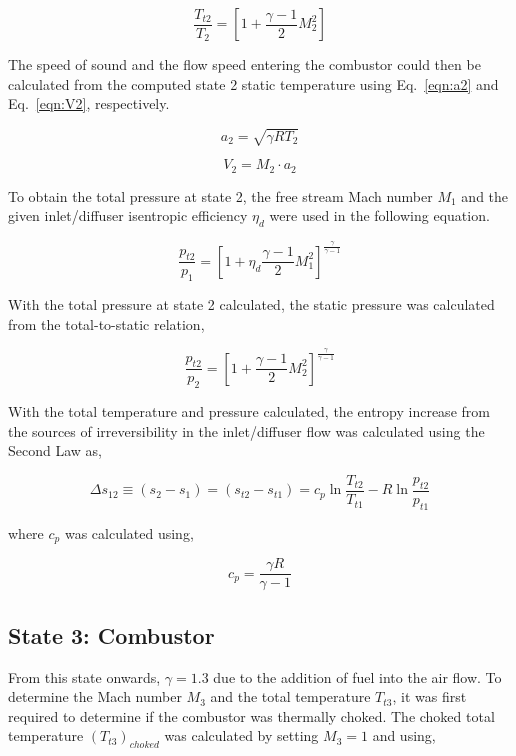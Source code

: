 \documentclass[conf]{new-aiaa} %
\begin{document}
\begin{equation}
    \label{eqn:T2}
    \frac{T_{t2}}{T_2}=\left[1+\frac{\gamma-1}{2}M_2^2\right]
\end{equation}

The speed of sound and the flow speed entering the combustor could then be calculated from the computed state 2 static temperature using Eq.~\eqref{eqn:a2} and Eq.~\eqref{eqn:V2}, respectively.

\begin{equation}
    \label{eqn:a2}
    a_2=\sqrt{\gamma R T_2}
\end{equation}

\begin{equation}
    \label{eqn:V2}
    V_2=M_2\cdot a_2
\end{equation}

To obtain the total pressure at state 2, the free stream Mach number $M_1$ and the given inlet/diffuser isentropic efficiency $\eta_d$ were used in the following equation.

\begin{equation}
    \label{eqn:pt2}
    \frac{p_{t2}}{p_1}=\left[1+\eta_d\frac{\gamma-1}{2}M_1^2\right]^{\frac{\gamma}{\gamma-1}}
\end{equation}

With the total pressure at state 2 calculated, the static pressure was calculated from the total-to-static relation,

\begin{equation}
    \label{eqn:p2}
    \frac{p_{t2}}{p_2}=\left[1+\frac{\gamma-1}{2}M_2^2\right]^{\frac{\gamma}{\gamma-1}}
\end{equation}

With the total temperature and pressure calculated, the entropy increase from the sources of irreversibility in the inlet/diffuser flow was calculated using the Second Law as,

\begin{equation}
    \label{eqn:dels12}
    \Delta s_{12}\equiv \left(s_2-s_1\right)=\left(s_{t2}-s_{t1}\right)=c_p \ln\frac{T_{t2}}{T_{t1}}-R\ln\frac{p_{t2}}{p_{t1}}
\end{equation}

where $c_p$ was calculated using,

\begin{equation}
    \label{eqn:cp}
    c_p=\frac{\gamma R}{\gamma-1}
\end{equation}

\subsection{State 3: Combustor}
From this state onwards, $\gamma=1.3$ due to the addition of fuel into the air flow. To determine the Mach number $M_3$ and the total temperature $T_{t3}$, it was first required to determine if the combustor was thermally choked. The choked total temperature $\left(T_{t3}\right)_{choked}$ was calculated by setting $M_3=1$ and using,
\end{document}
